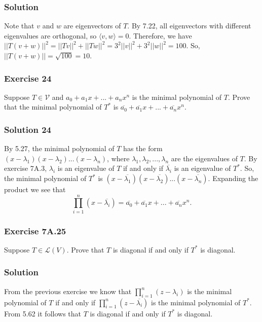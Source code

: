 \subsubsection*{Solution}

Note that $v$ and $w$ are eigenvectors of $T$.
By 7.22, all eigenvectors with different eigenvalues are orthogonal, so $\langle v, w \rangle = 0$.
Therefore, we have $||T(v + w)||^2 = ||Tv||^2 + ||Tw||^2 = 3^2 ||v||^2 + 3^2 ||w||^2 = 100$.
So, $||T(v + w)|| = \sqrt{100} = 10$.


\subsubsection*{Exercise 24}

Suppose $T \in \mathcal{V}$ and $a_0 + a_1 x + ... + a_n x^n$ is the minimal polynomial of $T$.
Prove that the minimal polynomial of $T^*$ is $\overline{a_0} + \overline{a_1} x + ... + \overline{a_n} x^n$.

\subsubsection*{Solution 24}

By 5.27, the minimal polynomial of $T$ has the form $(x - \lambda_1)(x - \lambda_2)...(x - \lambda_n)$, where $\lambda_1, \lambda_2, ..., \lambda_n$ are the eigenvalues of $T$.
By exercise 7A.3, $\lambda_i$ is an eigenvalue of $T$ if and only if $\overline{\lambda_i}$ is an eigenvalue of $T^*$.
So, the minimal polynomial of $T^*$ is $(x - \overline{\lambda_1})(x - \overline{\lambda_2})...(x - \overline{\lambda_n})$.
Expanding the product we see that
\begin{equation*}
    \prod_{i = 1}^n (x - \overline{\lambda_i})
        = \overline{a_0} + \overline{a_1}x + ... + \overline{a_n} x^n.
\end{equation*}


\subsubsection*{Exercise 7A.25}

Suppose $T \in \mathcal{L}(V)$.
Prove that $T$ is diagonal if and only if $T^*$ is diagonal.

\subsubsection*{Solution}

From the previous exercise we know that $\prod_{i=1}^n (z - \lambda_i)$ is the minimal polynomial of $T$ if and only if $\prod_{i=1}^n (z - \overline{\lambda_i})$ is the minimal polynomial of $T^*$.
From 5.62 it follows that $T$ is diagonal if and only if $T^*$ is diagonal.


